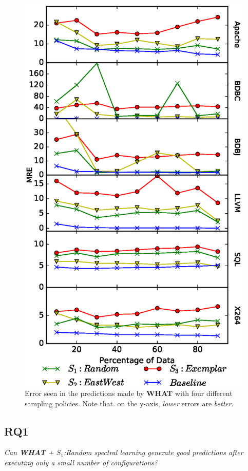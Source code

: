 \documentclass{sig-alternative}
\newcommand{\what}{{\bf WHAT }}
\begin{document}
\begin{figure}[!t]
\includegraphics[width=0.9\linewidth]{Figures/SamplingAccuracy.eps}
\caption{Error seen in the predictions made by \what with four different
sampling policies. Note that. on the y-axis,  {\em lower} errors are {\em better}.}
\label{fig:sampling_accuracy}
\end{figure}

\subsection{RQ1}
{\em Can  \what  + $S_1$:Random spectral learning generate good predictions after
executing only a small number of configurations?}
\end{document}

